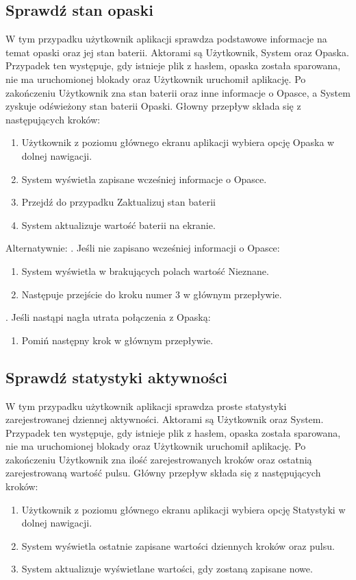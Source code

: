 \subsection{Sprawdź stan opaski}
W tym przypadku użytkownik aplikacji sprawdza podstawowe informacje na temat opaski oraz jej stan baterii. Aktorami są Użytkownik, System oraz Opaska. Przypadek ten występuje, gdy istnieje plik z hasłem, opaska została sparowana, nie ma uruchomionej blokady oraz Użytkownik uruchomił aplikację. Po zakończeniu Użytkownik zna stan baterii oraz inne informacje o Opasce, a System zyskuje odświeżony stan baterii Opaski. Głowny przepływ składa się z następujących kroków:
\begin{enumerate}
    \item Użytkownik z poziomu głównego ekranu aplikacji wybiera opcję Opaska w dolnej nawigacji.
    \item System wyświetla zapisane wcześniej informacje o Opasce.
    \item Przejdź do przypadku Zaktualizuj stan baterii
    \item System aktualizuje wartość baterii na ekranie.
\end{enumerate}
Alternatywnie:
\newline\newline
{}. Jeśli nie zapisano wcześniej informacji o Opasce:
\begin{enumerate}[leftmargin=3\parindent]
    \item System wyświetla w brakujących polach wartość Nieznane.
    \item Następuje przejście do kroku numer 3 w głównym przepływie.
\end{enumerate}
\quad\newline
{}. Jeśli nastąpi nagła utrata połączenia z Opaską:
\begin{enumerate}[leftmargin=3\parindent]
    \item Pomiń następny krok w głównym przepływie.
\end{enumerate}

\subsection{Sprawdź statystyki aktywności}
W tym przypadku użytkownik aplikacji sprawdza proste statystyki zarejestrowanej dziennej aktywności. Aktorami są Użytkownik oraz System. Przypadek ten występuje, gdy istnieje plik z hasłem, opaska została sparowana, nie ma uruchomionej blokady oraz Użytkownik uruchomił aplikację. Po zakończeniu Użytkownik zna ilość zarejestrowanych kroków oraz ostatnią zarejestrowaną wartość pulsu. Główny przepływ składa się z następujących kroków:
\begin{enumerate}
    \item Użytkownik z poziomu głównego ekranu aplikacji wybiera opcję Statystyki w dolnej nawigacji.
    \item System wyświetla ostatnie zapisane wartości dziennych kroków oraz pulsu.
    \item System aktualizuje wyświetlane wartości, gdy zostaną zapisane nowe.
\end{enumerate}

